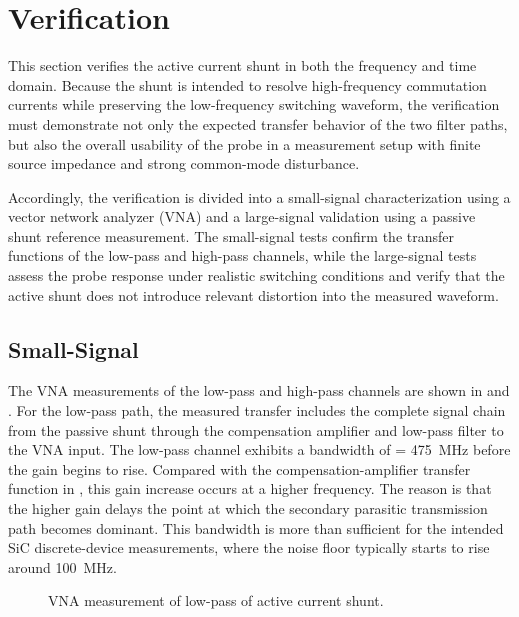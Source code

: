 

\section{Verification}

This section verifies the active current shunt in both the frequency and time domain.
Because the shunt is intended to resolve high-frequency commutation currents while preserving the low-frequency switching waveform, the verification must demonstrate not only the expected transfer behavior of the two filter paths, but also the overall usability of the probe in a measurement setup with finite source impedance and strong common-mode disturbance.

Accordingly, the verification is divided into a small-signal characterization using a vector network analyzer (VNA) and a large-signal validation using a passive shunt reference measurement.
The small-signal tests confirm the transfer functions of the low-pass and high-pass channels, while the large-signal tests assess the probe response under realistic switching conditions and verify that the active shunt does not introduce relevant distortion into the measured waveform.

\subsection*{Small-Signal}

The VNA measurements of the low-pass and high-pass channels are shown in  and .
For the low-pass path, the measured transfer includes the complete signal chain from the passive shunt through the compensation amplifier and low-pass filter to the VNA input.
The low-pass channel exhibits a bandwidth of  = \SI{475}{MHz} before the gain begins to rise.
Compared with the compensation-amplifier transfer function in , this gain increase occurs at a higher frequency.
The reason is that the higher gain delays the point at which the secondary parasitic transmission path becomes dominant.
This bandwidth is more than sufficient for the intended SiC discrete-device measurements, where the noise floor typically starts to rise around \SI{100}{MHz}.
	
\begin{figure}[ht]
	\centering
	
	\caption{VNA measurement of low-pass of active current shunt.}\label{fig:VNA_Shunt_LP}
\end{figure}


